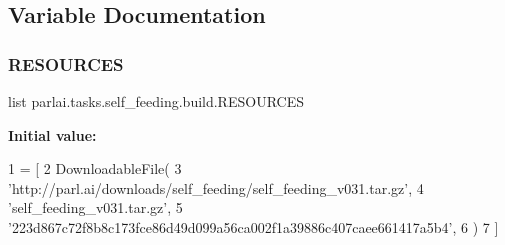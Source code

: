 \subsection{Variable Documentation}
\mbox{\label{namespaceparlai_1_1tasks_1_1self__feeding_1_1build_a8f48c31661cb0f086a2f690bc6214c1e}} 
\subsubsection{\texorpdfstring{R\+E\+S\+O\+U\+R\+C\+ES}{RESOURCES}}
{\footnotesize\ttfamily list parlai.\+tasks.\+self\+\_\+feeding.\+build.\+R\+E\+S\+O\+U\+R\+C\+ES}

{\bfseries Initial value\+:}
\begin{DoxyCode}
1 =  [
2     DownloadableFile(
3         \textcolor{stringliteral}{'http://parl.ai/downloads/self\_feeding/self\_feeding\_v031.tar.gz'},
4         \textcolor{stringliteral}{'self\_feeding\_v031.tar.gz'},
5         \textcolor{stringliteral}{'223d867c72f8b8c173fce86d49d099a56ca002f1a39886c407caee661417a5b4'},
6     )
7 ]
\end{DoxyCode}
